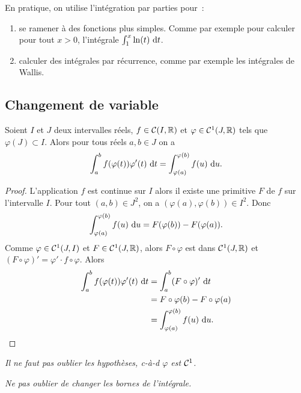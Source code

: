 En pratique, on utilise l'intégration par parties pour~:
\begin{enumerate}
\item se ramener à des fonctions plus simples. Comme par exemple pour calculer pour tout \(x>0\), l'intégrale \(\int_1^x \ln(t)\,\mathop{}\mathopen{}\mathrm{d} t\).
\item calculer des intégrales par récurrence, comme par exemple les intégrales de Wallis.
\end{enumerate}

\subsection{Changement de variable}

\begin{theo}
  Soient \(I\) et \(J\) deux intervalles réels, \(f \in \mathcal{C}(I,\mathbb{R})\) et \(\varphi \in \mathcal{C}^{1}(J,\mathbb{R})\) tels que \(\varphi(J) \subset I\). Alors pour tous réels \(a, b \in J\) on a
  \begin{equation}
    \int_a^b f(\varphi(t)) \varphi'(t)\,\mathop{}\mathopen{}\mathrm{d} t = \int_{\varphi(a)}^{\varphi(b)} f(u)\,\mathop{}\mathopen{}\mathrm{d} u.
  \end{equation}
\end{theo}
\begin{proof}
  L'application \(f\) est continue sur \(I\) alors il existe une primitive \(F\) de \(f\) sur l'intervalle \(I\). Pour tout \((a,b) \in J^2\), on a \((\varphi(a), \varphi(b)) \in I^2\). Donc
  \begin{equation}
    \int_{\varphi(a)}^{\varphi(b)}f(u)\,\mathop{}\mathopen{}\mathrm{d} u = F(\varphi(b)) - F(\varphi(a)).
  \end{equation}
  Comme \(\varphi \in \mathcal{C}^{1}(J,I)\) et \(F \in \mathcal{C}^{1}(J,\mathbb{R})\), alors \(F \circ \varphi\) est dans  \(\mathcal{C}^{1}(J,\mathbb{R})\) et \((F\circ \varphi)'=\varphi' \cdot f \circ \varphi\). Alors
  \begin{align}
    \int_a^b f(\varphi(t)) \varphi'(t)\,\mathop{}\mathopen{}\mathrm{d} t &= \int_a^b (F\circ \varphi)'\,\mathop{}\mathopen{}\mathrm{d} t\\
    &=F\circ \varphi(b) - F\circ \varphi(a) \\
    &=\int_{\varphi(a)}^{\varphi(b)}f(u)\,\mathop{}\mathopen{}\mathrm{d} u.
  \end{align}
\end{proof}

\danger \emph{Il ne faut pas oublier les hypothèses, c-à-d \(\varphi\) est \(\mathcal{C}^{1}\).}

\danger \emph{Ne pas oublier de changer les bornes de l'intégrale.}

